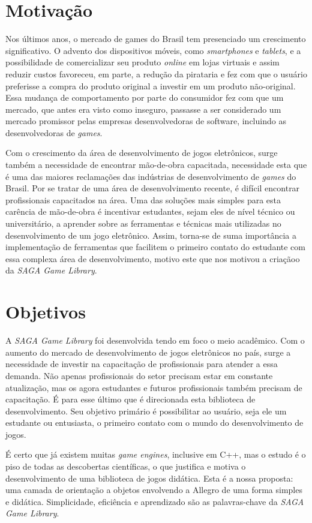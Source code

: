 \section{Motivação}
\label{section:motivacao}
%
%
%
Nos últimos anos, o mercado de games do Brasil tem presenciado um crescimento significativo. \cite{e}
O advento dos dispositivos móveis, como \textit{smartphones} e \textit{tablets}, e a possibilidade de comercializar seu produto \textit{online} em lojas virtuais e assim reduzir custos favoreceu, em parte, a redução da pirataria e fez com que o usuário preferisse a compra do produto original a investir em um produto não-original. Essa mudança de comportamento por parte do consumidor fez com que um mercado, que antes era visto como inseguro, passasse a ser considerado um mercado promissor pelas empresas desenvolvedoras de software, incluindo as desenvolvedoras de \textit{games}.
\par
Com o crescimento da área de desenvolvimento de jogos eletrônicos, surge também a necessidade de encontrar mão-de-obra capacitada, necessidade esta que é uma das maiores reclamações das indústrias de desenvolvimento de \textit{games} do Brasil. Por se tratar de uma área de desenvolvimento recente, é difícil encontrar profissionais capacitados na área. Uma das soluções mais simples para esta carência de mão-de-obra é incentivar estudantes, sejam eles de nível técnico ou universitário, a aprender sobre as ferramentas e técnicas mais utilizadas no desenvolvimento de um jogo eletrônico. Assim, torna-se de suma importância a implementação de ferramentas que facilitem o primeiro contato do estudante com essa complexa área de desenvolvimento, motivo este que nos motivou a criaçãoo da \textit{SAGA Game Library}.
%
%
\section{Objetivos}
\label{section:objetivos}
%
A \textit{SAGA Game Library} foi desenvolvida tendo em foco o meio acadêmico. Com o aumento do mercado de desenvolvimento de 
jogos eletrônicos no país, surge a necessidade de investir na capacitação de profissionais para atender a essa demanda. Não apenas profissionais do setor precisam estar em constante atualização, mas os agora estudantes e futuros profissionais também precisam de capacitação. É para esse último que é direcionada esta biblioteca de desenvolvimento. Seu objetivo primário é possibilitar ao usuário, seja ele um estudante ou entusiasta, o primeiro contato com o mundo do desenvolvimento de jogos.
%
\par
%
É certo que já existem muitas \textit{game engines}, inclusive em C++, mas o estudo é o piso de todas as descobertas científicas, o que justifica e motiva o desenvolvimento de uma biblioteca de jogos didática. Esta é a nossa proposta: uma camada de orientação a objetos envolvendo a Allegro de uma forma simples e didática. Simplicidade, eficiência e aprendizado são as palavras-chave da \textit{SAGA Game Library}.
%
%
%